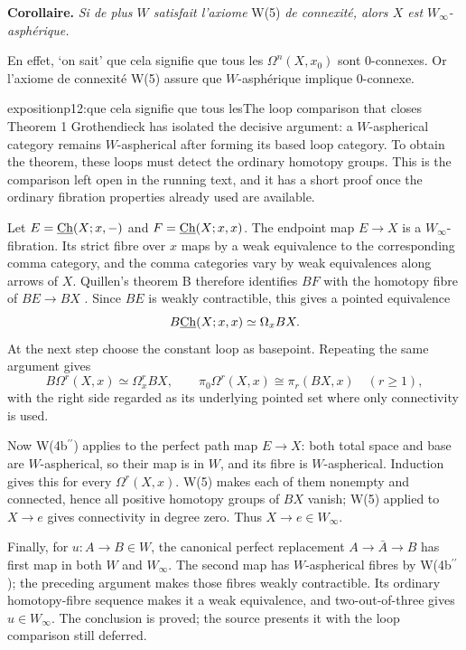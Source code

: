 \textbf{Corollaire.} \textit{Si de plus $W$ satisfait l'axiome} W(5) \textit{de connexité, alors $X$ est $W_\infty$-asphérique.}

En effet, `on sait' que cela signifie que tous les $\Omega^n(X, x_0)$ sont 0-connexes. Or l'axiome de connexité W(5) assure que $W$-asphérique implique 0-connexe.

\begin{dcomment}{exposition}{p12:que cela signifie que tous les}{The loop comparison that closes Theorem 1}
Grothendieck has isolated the decisive argument: a \(W\)-aspherical category remains \(W\)-aspherical after forming its based loop category. To obtain the theorem, these loops must detect the ordinary homotopy groups. This is the comparison left open in the running text, and it has a short proof once the ordinary fibration properties already used are available.

Let \(E=\underline{\mathrm{Ch}}(X;x,-)\) and \(F=\underline{\mathrm{Ch}}(X;x,x)\). The endpoint map \(E\to X\) is a \(W_\infty\)-fibration. Its strict fibre over \(x\) maps by a weak equivalence to the corresponding comma category, and the comma categories vary by weak equivalences along arrows of \(X\). Quillen's theorem B therefore identifies \(BF\) with the homotopy fibre of \(BE\to BX\) \citep[Theorem~B and its corollary, pp.~97--98]{Quillen1973}. Since \(BE\) is weakly contractible, this gives a pointed equivalence
\[
 B\underline{\mathrm{Ch}}(X;x,x)\simeq\Omega_x BX.
\]
At the next step choose the constant loop as basepoint. Repeating the same argument gives
\[
 B\Omega^r(X,x)\simeq\Omega^r_x BX,\qquad
 \pi_0\Omega^r(X,x)\cong\pi_r(BX,x)
 \quad(r\geq1),
\]
with the right side regarded as its underlying pointed set where only connectivity is used.

Now W(4b\(^{\prime\prime}\)) applies to the perfect path map \(E\to X\): both total space and base are \(W\)-aspherical, so their map is in \(W\), and its fibre is \(W\)-aspherical. Induction gives this for every \(\Omega^r(X,x)\). W(5) makes each of them nonempty and connected, hence all positive homotopy groups of \(BX\) vanish; W(5) applied to \(X\to e\) gives connectivity in degree zero. Thus \(X\to e\in W_\infty\).

Finally, for \(u:A\to B\in W\), the canonical perfect replacement \(A\to\bar A\to B\) has first map in both \(W\) and \(W_\infty\). The second map has \(W\)-aspherical fibres by W(4b\(^{\prime\prime}\)); the preceding argument makes those fibres weakly contractible. Its ordinary homotopy-fibre sequence makes it a weak equivalence, and two-out-of-three gives \(u\in W_\infty\). The conclusion is proved; the source presents it with the loop comparison still deferred.
\end{dcomment}


